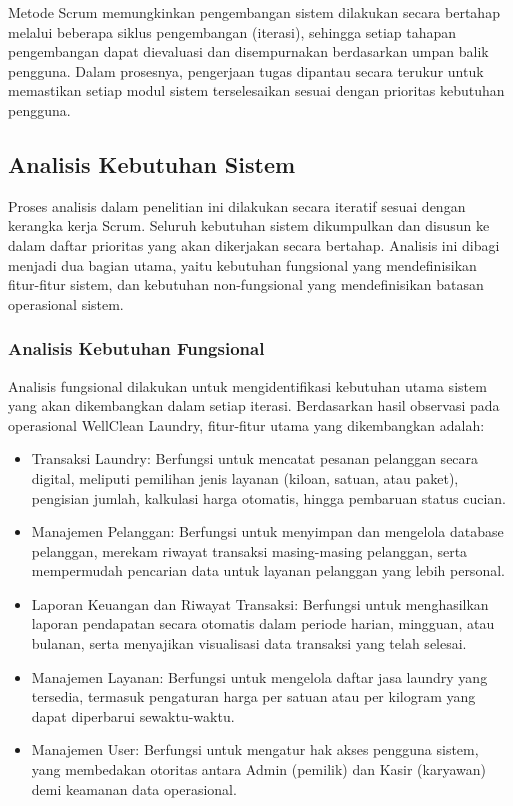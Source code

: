 Metode Scrum memungkinkan pengembangan sistem dilakukan secara bertahap melalui beberapa siklus pengembangan (iterasi), sehingga setiap tahapan pengembangan dapat dievaluasi dan disempurnakan berdasarkan umpan balik pengguna. Dalam prosesnya, pengerjaan tugas dipantau secara terukur untuk memastikan setiap modul sistem terselesaikan sesuai dengan prioritas kebutuhan pengguna.


\subsection{Analisis Kebutuhan Sistem}
\indent
Proses analisis dalam penelitian ini dilakukan secara iteratif sesuai dengan kerangka kerja Scrum. Seluruh kebutuhan sistem dikumpulkan dan disusun ke dalam daftar prioritas yang akan dikerjakan secara bertahap. Analisis ini dibagi menjadi dua bagian utama, yaitu kebutuhan fungsional yang mendefinisikan fitur-fitur sistem, dan kebutuhan non-fungsional yang mendefinisikan batasan operasional sistem.

\subsubsection{Analisis Kebutuhan Fungsional}
\indent
Analisis fungsional dilakukan untuk mengidentifikasi kebutuhan utama sistem yang akan dikembangkan dalam setiap iterasi. Berdasarkan hasil observasi pada operasional WellClean Laundry, fitur-fitur utama yang dikembangkan adalah:

\begin{itemize}
    \item Transaksi Laundry: Berfungsi untuk mencatat pesanan pelanggan secara digital, meliputi pemilihan jenis layanan (kiloan, satuan, atau paket), pengisian jumlah, kalkulasi harga otomatis, hingga pembaruan status cucian.
    \item Manajemen Pelanggan: Berfungsi untuk menyimpan dan mengelola database pelanggan, merekam riwayat transaksi masing-masing pelanggan, serta mempermudah pencarian data untuk layanan pelanggan yang lebih personal.
    \item Laporan Keuangan dan Riwayat Transaksi: Berfungsi untuk menghasilkan laporan pendapatan secara otomatis dalam periode harian, mingguan, atau bulanan, serta menyajikan visualisasi data transaksi yang telah selesai.
    \item Manajemen Layanan: Berfungsi untuk mengelola daftar jasa laundry yang tersedia, termasuk pengaturan harga per satuan atau per kilogram yang dapat diperbarui sewaktu-waktu.
    \item Manajemen User: Berfungsi untuk mengatur hak akses pengguna sistem, yang membedakan otoritas antara Admin (pemilik) dan Kasir (karyawan) demi keamanan data operasional.
\end{itemize}

